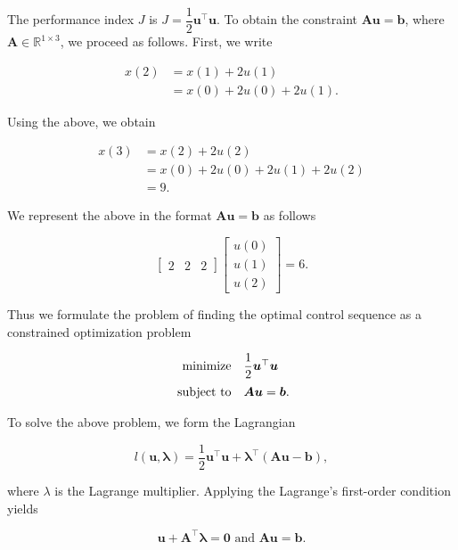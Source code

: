 The performance index \(J\) is \(J=\dfrac{1}{2} \boldsymbol{u}^{\top} \boldsymbol{u}\). To obtain the constraint \(\boldsymbol{A} \boldsymbol{u}=\boldsymbol{b}\), where \(\boldsymbol{A} \in \mathbb{R}^{1 \times 3}\), we proceed as follows. First, we write

\[
	\begin{aligned}
		x(2) & =x(1)+2 u(1) \\
		& =x(0)+2 u(0)+2 u(1) .
	\end{aligned}
\]

Using the above, we obtain

\[
	\begin{aligned}
		x(3) & =x(2)+2 u(2) \\
		& =x(0)+2 u(0)+2 u(1)+2 u(2) \\
		& =9 .
	\end{aligned}
\]

We represent the above in the format \(\boldsymbol{A} \boldsymbol{u}=\boldsymbol{b}\) as follows

\[
	\left[\begin{array}{lll}
		2 & 2 & 2
	\end{array}\right]\left[\begin{array}{l}
		u(0) \\
		u(1) \\
		u(2)
	\end{array}\right]=6 .
\]

Thus we formulate the problem of finding the optimal control sequence as a constrained optimization problem

\[
	\begin{array}{rl}
		\operatorname{minimize} & \dfrac{1}{2} \boldsymbol{u}^{\top} \boldsymbol{u} \vspace{2mm}\\
		\text { subject to} & \boldsymbol{A} \boldsymbol{u}=\boldsymbol{b} .
	\end{array}
\]

To solve the above problem, we form the Lagrangian

\[
	l(\boldsymbol{u}, \boldsymbol{\lambda} )=\frac{1}{2} \boldsymbol{u}^{\top} \boldsymbol{u}+ \boldsymbol{\lambda}^{\top} (\boldsymbol{A} \boldsymbol{u}-\boldsymbol{b}),
\]

where \(\lambda\) is the Lagrange multiplier. Applying the Lagrange's first-order condition yields

\[
	\boldsymbol{u}+\boldsymbol{A}^{\top} \boldsymbol{\lambda}=\boldsymbol{0} \text { and } \boldsymbol{A} \boldsymbol{u}=\boldsymbol{b} .
\]

